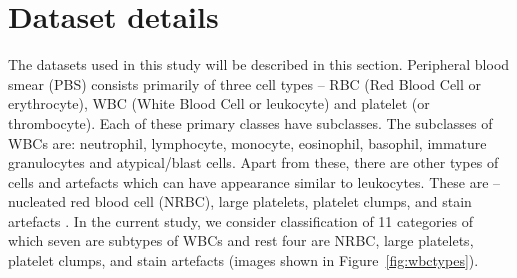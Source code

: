 \documentclass[journal,twoside,web]{IEEEtran}
\begin{document}
\section{Dataset details}
The datasets used in this study will be described in this section. Peripheral blood smear (PBS) consists primarily of three cell types -- RBC (Red Blood Cell or erythrocyte), WBC (White Blood Cell or leukocyte) and platelet (or thrombocyte). Each of these primary classes have subclasses. The subclasses of WBCs are: neutrophil, lymphocyte, monocyte, eosinophil, basophil, immature granulocytes and atypical/blast cells. Apart from these, there are other types of cells and artefacts which can have appearance similar to leukocytes.
These are -- nucleated red blood cell (NRBC), large platelets, platelet clumps, and stain artefacts \cite{bloodbook}. In the current study, we consider classification of 11 categories of which seven are subtypes of WBCs and rest four are NRBC, large platelets, platelet clumps, and stain artefacts (images shown in Figure~\ref{fig:wbctypes}). 
\end{document}
